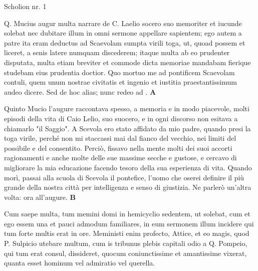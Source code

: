 \documentclass[a4paper]{book}
\begin{document}
\beginnumbering
\numberpstarttrue
{}

\pstart{}%
    Scholion nr. 1%
\pend

\begin{pairs}
\begin{Leftside}
\beginnumbering
\numberpstartfalse
    \pstart\noindent Q. Mucius augur multa narrare de C. Laelio socero suo memoriter et iucunde solebat nec dubitare illum in omni sermone appellare sapientem; ego autem a patre ita eram deductus ad Scaevolam sumpta virili toga, ut, quoad possem et liceret, a senis latere numquam discederem; itaque multa ab eo prudenter disputata, multa etiam breviter et commode dicta memoriae mandabam fierique studebam eius prudentia doctior. Quo mortuo me ad pontificem Scaevolam contuli, quem unum nostrae civitatis et ingenio et iustitia praestantissimum audeo dicere. Sed de hoc alias; nunc redeo ad . \textbf{A}\pend
\pausenumbering
\end{Leftside}

\begin{Rightside}
\beginnumbering
\numberpstartfalse
    \pstart\noindent Quinto Mucio l'augure raccontava spesso, a memoria e in modo piacevole, molti episodi della vita di Caio Lelio, suo suocero, e in ogni discorso non esitava a chiamarlo "il Saggio". A Scevola ero stato affidato da mio padre, quando presi la toga virile, perché non mi staccassi mai dal fianco del vecchio, nei limiti del possibile e del consentito. Perciò, fissavo nella mente molti dei suoi accorti ragionamenti e anche molte delle sue massime secche e gustose, e cercavo di migliorare la mia educazione facendo tesoro della sua esperienza di vita. Quando morì, passai alla scuola di Scevola il pontefice, l'uomo che oserei definire il più grande della nostra città per intelligenza e senso di giustizia. Ne parlerò un'altra volta: ora  all'augure. \textbf{B}\pend{}
\pausenumbering
\end{Rightside}
\end{pairs}
\Columns


\pstart%
    Cum saepe multa, tum memini domi in hemicyclio sedentem, ut solebat, cum et ego essem una et pauci admodum familiares, in eum sermonem illum incidere qui tum forte multis erat in ore. Meministi enim profecto, Attice, et eo magis, quod P. Sulpicio utebare multum, cum is tribunus plebis capitali odio a Q. Pompeio, qui tum erat consul, dissideret, quocum coniunctissime et amantissime vixerat, quanta esset hominum vel admiratio vel querella.%
\pend
\end{document}
